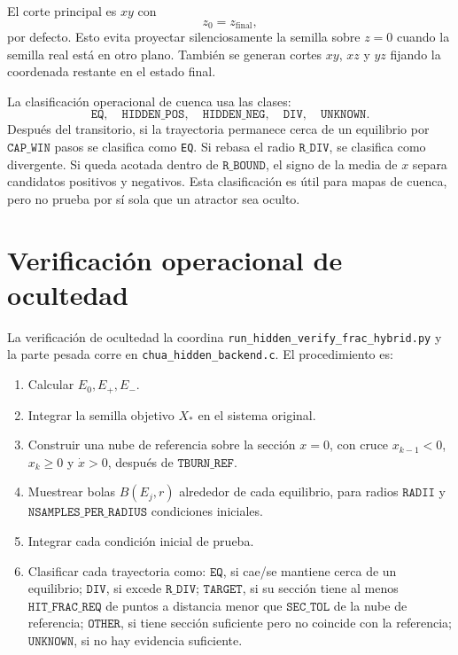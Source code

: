 \documentclass[11pt]{article}
\begin{document}
El corte principal es \(xy\) con
\[
z_0 = z_{\mathrm{final}},
\]
por defecto. Esto evita proyectar silenciosamente la semilla sobre \(z=0\)
cuando la semilla real está en otro plano. También se generan cortes \(xy\),
\(xz\) y \(yz\) fijando la coordenada restante en el estado final.

La clasificación operacional de cuenca usa las clases:
\[
\texttt{EQ},\quad
\texttt{HIDDEN\_POS},\quad
\texttt{HIDDEN\_NEG},\quad
\texttt{DIV},\quad
\texttt{UNKNOWN}.
\]
Después del transitorio, si la trayectoria permanece cerca de un equilibrio
por \(\texttt{CAP\_WIN}\) pasos se clasifica como \texttt{EQ}. Si rebasa el
radio \(\texttt{R\_DIV}\), se clasifica como divergente. Si queda acotada
dentro de \(\texttt{R\_BOUND}\), el signo de la media de \(x\) separa
candidatos positivos y negativos. Esta clasificación es útil para mapas de
cuenca, pero no prueba por sí sola que un atractor sea oculto.

\section{Verificación operacional de ocultedad}

La verificación de ocultedad la coordina
\texttt{run\_hidden\_verify\_frac\_hybrid.py} y la parte pesada corre en
\texttt{chua\_hidden\_backend.c}. El procedimiento es:
\begin{enumerate}
\item Calcular \(E_0,E_+,E_-\).
\item Integrar la semilla objetivo \(X_\ast\) en el sistema original.
\item Construir una nube de referencia sobre la sección \(x=0\), con cruce
\(x_{k-1}<0\), \(x_k\geq0\) y \(\dot{x}>0\), después de
\(\texttt{TBURN\_REF}\).
\item Muestrear bolas \(B(E_j,r)\) alrededor de cada equilibrio, para radios
\(\texttt{RADII}\) y \(\texttt{NSAMPLES\_PER\_RADIUS}\) condiciones iniciales.
\item Integrar cada condición inicial de prueba.
\item Clasificar cada trayectoria como:
\(\texttt{EQ}\), si cae/se mantiene cerca de un equilibrio;
\(\texttt{DIV}\), si excede \(\texttt{R\_DIV}\);
\(\texttt{TARGET}\), si su sección tiene al menos
\(\texttt{HIT\_FRAC\_REQ}\) de puntos a distancia menor que
\(\texttt{SEC\_TOL}\) de la nube de referencia;
\(\texttt{OTHER}\), si tiene sección suficiente pero no coincide con la
referencia;
\(\texttt{UNKNOWN}\), si no hay evidencia suficiente.
\end{enumerate}
\end{document}
